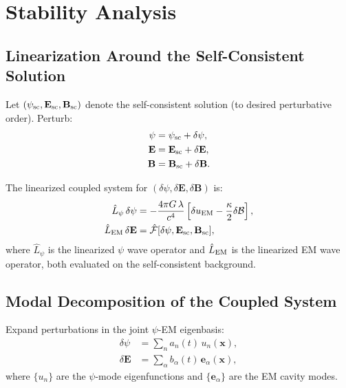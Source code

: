 \documentclass[aps,prd,twocolumn,superscriptaddress,floatfix,nofootinbib]{revtex4-2}
\newcommand{\lam}{\lambda}
\newcommand{\kap}{\kappa}
\newcommand{\calB}{\mathcal{B}}
\begin{document}
\section{Stability Analysis}\label{sec:stability}

\subsection{Linearization Around the Self-Consistent Solution}

Let $(\psi_{\rm sc}, \mathbf{E}_{\rm sc}, \mathbf{B}_{\rm sc})$ denote
the self-consistent solution (to desired perturbative order). Perturb:
\begin{align}
\psi &= \psi_{\rm sc} + \delta\psi, \\
\mathbf{E} &= \mathbf{E}_{\rm sc} + \delta\mathbf{E}, \\
\mathbf{B} &= \mathbf{B}_{\rm sc} + \delta\mathbf{B}.
\end{align}

The linearized coupled system for
$(\delta\psi, \delta\mathbf{E}, \delta\mathbf{B})$ is:
\begin{align}
\hat{L}_\psi\,\delta\psi &= -\frac{4\pi G\,\lam}{c^4}
\left[\delta u_{\rm EM} - \frac{\kap}{2}\delta\calB\right],
\label{eq:lin-psi}\\
\hat{L}_{\rm EM}\,\delta\mathbf{E} &= \hat{\mathcal{F}}
[\delta\psi, \mathbf{E}_{\rm sc}, \mathbf{B}_{\rm sc}],
\label{eq:lin-EM}
\end{align}
where $\hat{L}_\psi$ is the linearized $\psi$ wave operator and
$\hat{L}_{\rm EM}$ is the linearized EM wave operator, both evaluated
on the self-consistent background.

\subsection{Modal Decomposition of the Coupled System}

Expand perturbations in the joint $\psi$-EM eigenbasis:
\begin{align}
\delta\psi &= \sum_n a_n(t)\,u_n(\mathbf{x}), \\
\delta\mathbf{E} &= \sum_\alpha b_\alpha(t)\,\mathbf{e}_\alpha(\mathbf{x}),
\end{align}
where $\{u_n\}$ are the $\psi$-mode eigenfunctions and
$\{\mathbf{e}_\alpha\}$ are the EM cavity modes.
\end{document}
